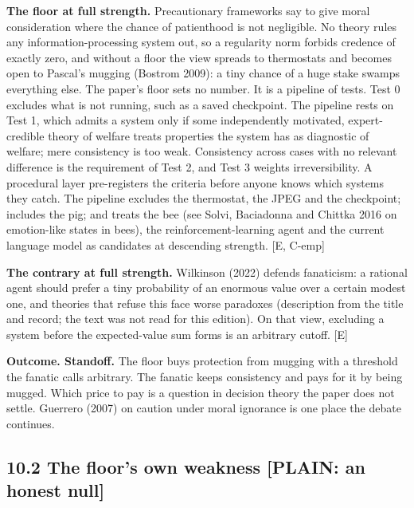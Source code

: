 \documentclass[11pt]{article}
\newcommand{\register}[1]{{\ttfamily\small #1}}
\begin{document}
\textbf{The floor at full strength.} Precautionary frameworks say to give moral consideration where the chance of patienthood is not negligible. No theory rules any information-processing system out, so a regularity norm forbids credence of exactly zero, and without a floor the view spreads to thermostats and becomes open to Pascal's mugging (Bostrom 2009): a tiny chance of a huge stake swamps everything else. The paper's floor sets no number. It is a pipeline of tests. Test 0 excludes what is not running, such as a saved checkpoint. The pipeline rests on Test 1, which admits a system only if some independently motivated, expert-credible theory of welfare treats properties the system has as diagnostic of welfare; mere consistency is too weak. Consistency across cases with no relevant difference is the requirement of Test 2, and Test 3 weights irreversibility. A procedural layer pre-registers the criteria before anyone knows which systems they catch. The pipeline excludes the thermostat, the JPEG and the checkpoint; includes the pig; and treats the bee (see Solvi, Baciadonna and Chittka 2016 on emotion-like states in bees), the reinforcement-learning agent and the current language model as candidates at descending strength. [E, C-emp]

\textbf{The contrary at full strength.} Wilkinson (2022) defends fanaticism: a rational agent should prefer a tiny probability of an enormous value over a certain modest one, and theories that refuse this face worse paradoxes (description from the title and record; the text was not read for this edition). On that view, excluding a system before the expected-value sum forms is an arbitrary cutoff. [E]

\textbf{Outcome. Standoff.} The floor buys protection from mugging with a threshold the fanatic calls arbitrary. The fanatic keeps consistency and pays for it by being mugged. Which price to pay is a question in decision theory the paper does not settle. Guerrero (2007) on caution under moral ignorance is one place the debate continues.

\subsection*{10.2 The floor's own weakness \register{[PLAIN: an honest null]}}
\end{document}
